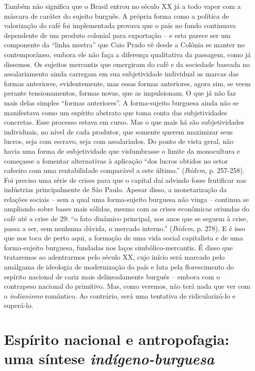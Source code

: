 Também não significa que o Brasil entrou no século XX já a todo vapor
com a máscara de caráter do sujeito burguês. A própria forma como a
política de valorização do café foi implementada provava que o país no
fundo continuava dependente de um produto colonial para exportação -- e
esta parece ser um componente da ``linha mestra'' que Caio Prado vê
desde a Colônia se manter no contemporâneo, embora ele não faça a
diferença qualitativa da passagem, como já dissemos. Os sujeitos
mercantis que emergiram do café e da sociedade baseada no assalariamento
ainda carregam em sua subjetividade individual as marcas das formas
anteriores, evidentemente, mas essas formas anteriores, agora sim, se
veem perante tensionamentos, formas novas, que as impulsionam. O que já
não faz mais delas simples ``formas anteriores''. A forma-sujeito
burguesa ainda não se manifestava como um espírito abstrato que toma
conta das subjetividades concretas. Esse processo estava em curso. Mas o
que mais há são subjetividades individuais, no nível de cada produtor,
que somente querem maximizar seus lucros, seja com escravo, seja com
assalariados. Do ponto de vista geral, não havia uma forma de
subjetividade que vislumbrasse o limite da monocultura e começasse a
fomentar alternativas à aplicação ``dos lucros obtidos no setor cafeeiro
com uma rentabilidade comparável a este último.'' (\emph{Ibidem}, p.
257-258). Foi preciso uma série de crises para que o capital daí advindo
fosse frutificar nas indústrias principalmente de São Paulo. Apesar
disso, a monetarização da relações sociais -- sem a qual uma
forma-sujeito burguesa não vinga -- continua se ampliando sobre bases
mais sólidas, mesmo com as crises econômicas oriundas do café até a
crise de 29: ``o fato dinâmico principal, nos anos que se seguem à
crise, passa a ser, sem nenhuma dúvida, o mercado interno.''
(\emph{Ibidem}, p. 278). E é isso que nos toca de perto aqui, a formação
de uma vida social capitalista e de uma forma-sujeito burguesa, fundadas
nos laços simbólico-mercantis. É disso que trataremos ao adentrarmos
pelo século XX, cujo início será marcado pelo amálgama de ideologia de
modernização do país e luta pela florescimento do espírito nacional de
cariz mais delineadamente burguês -- embora com o contrapeso nacional do
primitivo. Mas, como veremos, não terá nada que ver com o
\emph{indianismo} romântico. Ao contrário, será uma tentativa de
ridicularizá-lo e superá-lo.

\section{Espírito nacional e antropofagia: uma síntese \emph{indígeno-burguesa}}

